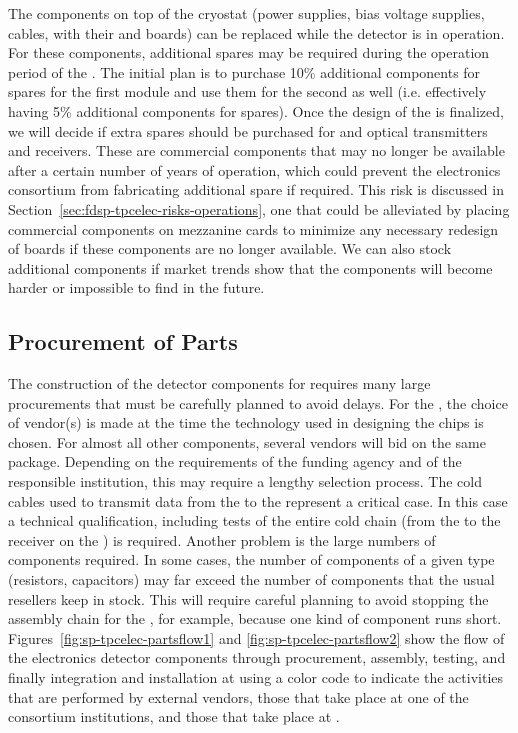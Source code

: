 The components on top of the cryostat (power supplies, bias
voltage supplies, cables,  with their 
and  boards) can be replaced while the
detector is in operation. For these components, additional spares may be required
during the \dunelifetime operation period of the  .
The initial plan is to purchase 10\% additional components for spares for the first
  module and use them for the second    as well
(i.e. effectively having 5\% additional components for spares). Once the design of
the  is finalized, we will decide if 
extra spares should be purchased for  and optical
transmitters and receivers. These are commercial components 
that may no longer be available after a certain number of 
years of operation, which could prevent the  electronics consortium from
fabricating additional spare  if required. This
risk is discussed in Section~\ref{sec:fdsp-tpcelec-risks-operations}, one that
could be alleviated by placing commercial components
on mezzanine cards to minimize any necessary redesign of
boards if these components are no longer available.
We can also stock additional components
if market trends show that the components will  
become harder or impossible to find in the future.

\subsection{Procurement of Parts}
\label{sec:fdsp-tpcelec-production-procurement}

The construction of the detector components for  requires many large procurements that 
must be carefully planned to avoid delays. For the , the 
choice of vendor(s) is made at the time the technology used in designing 
the chips is chosen. For almost all other components, several vendors 
will bid on the same package. Depending on the requirements of the funding
agency and of the responsible institution, this may require a lengthy
selection process. The cold cables used to transmit data from the
 to the  represent a critical case. In this case
a technical qualification, including tests of the entire cold chain (from the 
to the receiver on the ) is required. Another problem is the 
large numbers of components required. In some cases, the number of components 
of a given type (resistors, capacitors) may far exceed the number of components
that the usual resellers keep in stock. This will 
require careful planning to avoid stopping the assembly chain for
the , for example, because 
one kind of component runs short. Figures~\ref{fig:sp-tpcelec-partsflow1}
and \ref{fig:sp-tpcelec-partsflow2} show the flow of the 
electronics detector components through procurement, assembly,
 testing, and finally integration and installation at 
 using a color code to indicate the activities that
are performed by external vendors, those that take place at one of
the consortium institutions, and those that take place at .

